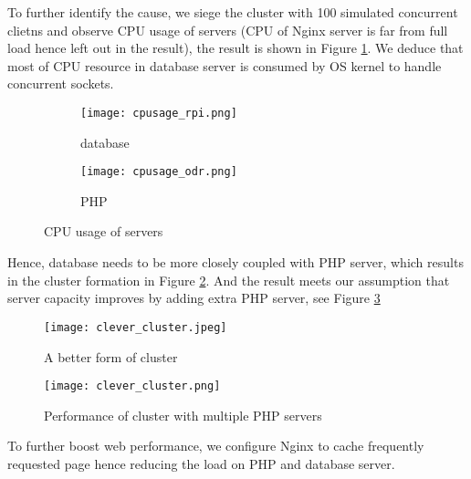 To further identify the cause, we siege the cluster with 100 simulated concurrent clietns and observe CPU usage of servers (CPU of Nginx server is far from full load hence left out in the result), the result is shown in Figure \ref{cpu_usage}. We deduce that most of CPU resource in database server is consumed by OS kernel to handle concurrent sockets.
\begin{figure}[htbp]
\centering
\begin{subfigure}{0.45\textwidth}
\centering
\texttt{[image: cpusage\_rpi.png]}
\caption{database}
\end{subfigure}
\begin{subfigure}{0.45\textwidth}
\centering
\texttt{[image: cpusage\_odr.png]}
\caption{PHP}
\end{subfigure}
\caption{CPU usage of servers}
\label{cpu_usage}
\end{figure}
Hence, database needs to be more closely coupled with PHP server, which results in the cluster formation in Figure \ref{good_cluster}. And the result meets our assumption that server capacity improves by adding extra PHP server, see Figure \ref{good_cluster_perf}
\begin{figure}[htbp]
\centering
\texttt{[image: clever\_cluster.jpeg]}
\caption{A better form of cluster}
\label{good_cluster}
\end{figure}
\begin{figure}[htbp]
\centering
\texttt{[image: clever\_cluster.png]}
\caption{Performance of cluster with multiple PHP servers}
\label{good_cluster_perf}
\end{figure}

To further boost web performance, we configure Nginx to cache frequently requested page hence reducing the load on PHP and database server.




